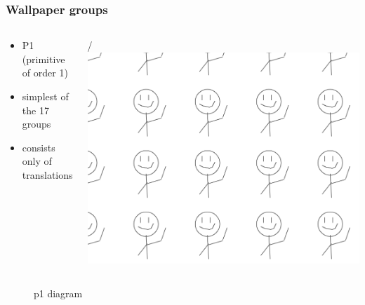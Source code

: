 \documentclass{beamer}
\theoremstyle{definition}
\begin{document}
\begin{frame}
  \frametitle{Wallpaper groups}
  \begin{columns}
  \begin{definition}
      \begin{itemize}
          \item P1 (primitive of order 1)\cite{Trefor1}
          \item simplest of the 17 groups 
          \item consists only of translations
      \end{itemize}
  \end{definition}/
  \includegraphics[width=\textwidth]{Figures/p_examples/eschersketch_p1_example_person.png}
  \end{columns}
  \begin{figure}
        \centering
        \scalebox{0.7}{}
        \caption{p1 diagram}
        \label{fig:p1}
  \end{figure}
\end{frame}
\end{document}
